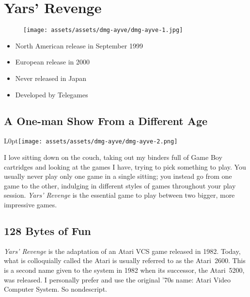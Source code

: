 \documentclass{book}
\begin{document}
\chapter*{Yars’ Revenge}
\vspace{\baselineskip}\begin{figure}[H]{\texttt{[image: assets/assets/dmg-ayve/dmg-ayve-1.jpg]}}\end{figure}\vspace{\baselineskip}
\begin{itemize}[left=0pt, nosep]
\item North American release in September 1999
\item European release in 2000
\item Never released in Japan
\item Developed by Telegames

\end{itemize}
\newpage\FloatBarrier\section*{A One-man Show From a Different Age}
\begin{wrapfigure}{L}{0pt}{\texttt{[image: assets/assets/dmg-ayve/dmg-ayve-2.png]}}\end{wrapfigure}\noindent
I love sitting down on the couch, taking out my binders full of Game Boy cartridges and looking at the games I have, trying to pick something to play. You usually never play only one game in a single sitting; you instead go from one game to the other, indulging in different styles of games throughout your play session. \emph{Yars’ Revenge} is the essential game to play between two bigger, more impressive games.\par
\FloatBarrier\section*{128 Bytes of Fun}
\emph{Yars’ Revenge} is the adaptation of an Atari VCS game released in 1982. Today, what is colloquially called the Atari is usually referred to as the Atari~2600. This is a second name given to the system in 1982 when its successor, the Atari~5200, was released. I personally prefer and use the original ’70s name: Atari Video Computer System. So nondescript.\par
\end{document}
